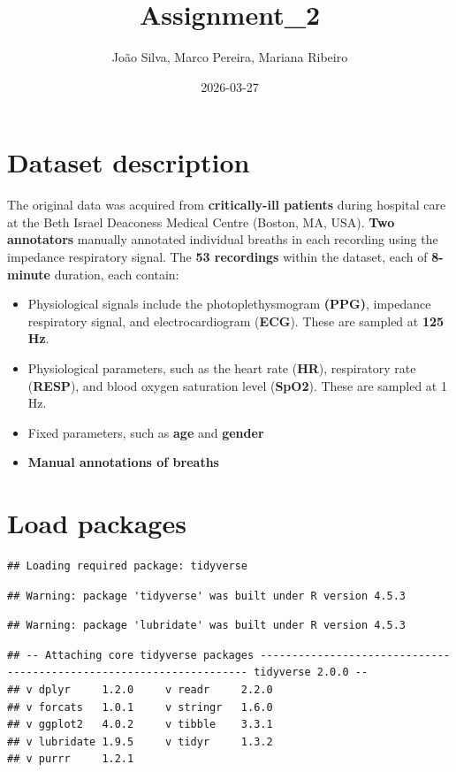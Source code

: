 \documentclass[
]{article}
\title{Assignment\_2}
\author{João Silva, Marco Pereira, Mariana Ribeiro}
\date{2026-03-27}
\providecommand{\tightlist}{%
  \setlength{\itemsep}{0pt}\setlength{\parskip}{0pt}}
\begin{document}
\maketitle

\section{Dataset description}\label{dataset-description}

The original data was acquired from \textbf{critically-ill patients}
during hospital care at the Beth Israel Deaconess Medical Centre
(Boston, MA, USA). \textbf{Two annotators} manually annotated individual
breaths in each recording using the impedance respiratory signal. The
\textbf{53 recordings} within the dataset, each of \textbf{8-minute}
duration, each contain:

\begin{itemize}
\tightlist
\item
  Physiological signals include the photoplethysmogram \textbf{(PPG)},
  impedance respiratory signal, and electrocardiogram (\textbf{ECG}).
  These are sampled at \textbf{125 Hz}.
\item
  Physiological parameters, such as the heart rate (\textbf{HR}),
  respiratory rate (\textbf{RESP}), and blood oxygen saturation level
  (\textbf{SpO2}). These are sampled at 1 Hz.
\item
  Fixed parameters, such as \textbf{age} and \textbf{gender}
\item
  \textbf{Manual annotations of breaths}
\end{itemize}

\section{Load packages}\label{load-packages}

\begin{verbatim}
## Loading required package: tidyverse
\end{verbatim}

\begin{verbatim}
## Warning: package 'tidyverse' was built under R version 4.5.3
\end{verbatim}

\begin{verbatim}
## Warning: package 'lubridate' was built under R version 4.5.3
\end{verbatim}

\begin{verbatim}
## -- Attaching core tidyverse packages -------------------------------------------------------------------- tidyverse 2.0.0 --
## v dplyr     1.2.0     v readr     2.2.0
## v forcats   1.0.1     v stringr   1.6.0
## v ggplot2   4.0.2     v tibble    3.3.1
## v lubridate 1.9.5     v tidyr     1.3.2
## v purrr     1.2.1
\end{verbatim}
\end{document}
